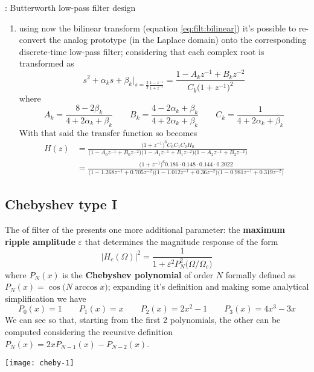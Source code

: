 \begin{example}{: Butterworth low-pass filter design}
\begin{enumerate}
				\item using now the bilinear transform (equation \ref{eq:filt:bilinear}) it's possible to re-convert the analog prototype  (in the Laplace domain) onto the corresponding discrete-time low-pass filter; considering that each complex root is transformed as
				\[ s^2 + \alpha_k s + \beta_k\Big|_{s =  \frac 2 T \frac{1-z^{-1}}{1+z^{-1}}} = \frac{1- A_k z^{-1} + B_kz^{-2}}{C_k \big(1+z^{-1}\big)^2} \]
				where
				\[ A_k = \frac{8-2\beta_k}{4+2\alpha_k + \beta_k} \qquad B_k = \frac{4-2\alpha_k + \beta_k}{4 + 2\alpha_k +\beta_k} \qquad C_k = \frac 1 {4+2\alpha_k + \beta_k} \]
				With that said the transfer function so becomes
				\begin{align*}
					H(z) & = \frac{\big(1+z^{-1}\big)^6 C_0C_1C_2 H_0}{ \big(1 - A_0 z^{-1} + B_0z^{-2}\big) \big(1 - A_1 z^{-1} + B_1z^{-2}\big) \big(1 - A_2 z^{-1} + B_2z^{-2}\big) } \\
					& = \frac{\big(1+z^{-1}\big)^6 0.186\cdot 0.148\cdot 0.144 \cdot 0.2022}{ \big(1 - 1.268 z^{-1} + 0.705z^{-2}\big) \big(1 - 1.012 z^{-1} + 0.36z^{-2}\big) \big(1 - 0.981 z^{-1} + 0.319z^{-2}\big) }
				\end{align*}
				
				
				
				
			\end{enumerate}
		\end{example}
		
	\subsection{Chebyshev type I}
		The  of filter of the  presents one more additional parameter: the \textbf{maximum ripple amplitude} $\varepsilon$ that determines the magnitude response of the form
		\begin{equation} \label{eq:filt:cheby1}
			\big|H_c(\Omega)\big|^2 = \frac{1}{1 + \varepsilon^2 P_N^2 \big(\Omega/\Omega_c\big)}
		\end{equation}
		where $P_N(x)$ is the \textbf{Chebyshev polynomial} of order $N$ formally defined as $P_N(x) = \cos\big(N\arccos x\big)$; expanding it's definition and making some analytical simplification we have
		\[ P_0(x) = 1 \qquad P_1(x) = x \qquad P_2(x) = 2x^2-1 \qquad P_3(x) = 4x^3-3x \]
		We can see so that, starting from the first 2 polynomials, the other can be computed considering the recursive definition $P_N(x) = 2x P_{N-1}(x) - P_{N-2}(x)$.
		
		\begin{SCfigure}[2][bt]
			\centering \texttt{[image: cheby-1]}
			\caption{Bode plots of the response of the Chebyshev type I filter.} \label{fig:filt:cheby-1bode}
		\end{SCfigure}
		
